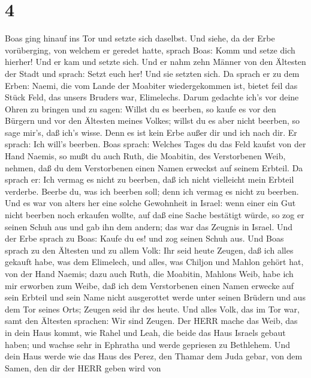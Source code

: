 \hypertarget{section-3}{%
\section{4}\label{section-3}}

 Boas ging hinauf ins Tor und setzte sich daselbst. Und
siehe, da der Erbe vorüberging, von welchem er geredet hatte, sprach
Boas: Komm und setze dich hierher! Und er kam und setzte sich.
 Und er nahm zehn Männer von den Ältesten der Stadt und
sprach: Setzt euch her! Und sie setzten sich.  Da sprach er
zu dem Erben: Naemi, die vom Lande der Moabiter wiedergekommen ist,
bietet feil das Stück Feld, das unsers Bruders war, Elimelechs.
 Darum gedachte ich's vor deine Ohren zu bringen und zu
sagen: Willst du es beerben, so kaufe es vor den Bürgern und vor den
Ältesten meines Volkes; willst du es aber nicht beerben, so sage mir's,
daß ich's wisse. Denn es ist kein Erbe außer dir und ich nach dir. Er
sprach: Ich will's beerben.  Boas sprach: Welches Tages du
das Feld kaufst von der Hand Naemis, so mußt du auch Ruth, die Moabitin,
des Verstorbenen Weib, nehmen, daß du dem Verstorbenen einen Namen
erweckst auf seinem Erbteil.  Da sprach er: Ich vermag es
nicht zu beerben, daß ich nicht vielleicht mein Erbteil verderbe. Beerbe
du, was ich beerben soll; denn ich vermag es nicht zu beerben.
 Und es war von alters her eine solche Gewohnheit in Israel:
wenn einer ein Gut nicht beerben noch erkaufen wollte, auf daß eine
Sache bestätigt würde, so zog er seinen Schuh aus und gab ihn dem
andern; das war das Zeugnis in Israel.  Und der Erbe sprach
zu Boas: Kaufe du es! und zog seinen Schuh aus.  Und Boas
sprach zu den Ältesten und zu allem Volk: Ihr seid heute Zeugen, daß ich
alles gekauft habe, was dem Elimelech, und alles, was Chiljon und Mahlon
gehört hat, von der Hand Naemis;  dazu auch Ruth, die
Moabitin, Mahlons Weib, habe ich mir erworben zum Weibe, daß ich dem
Verstorbenen einen Namen erwecke auf sein Erbteil und sein Name nicht
ausgerottet werde unter seinen Brüdern und aus dem Tor seines Orts;
Zeugen seid ihr des heute.  Und alles Volk, das im Tor war,
samt den Ältesten sprachen: Wir sind Zeugen. Der HERR mache das Weib,
das in dein Haus kommt, wie Rahel und Leah, die beide das Haus Israels
gebaut haben; und wachse sehr in Ephratha und werde gepriesen zu
Bethlehem.  Und dein Haus werde wie das Haus des Perez, den
Thamar dem Juda gebar, von dem Samen, den dir der HERR geben wird von
